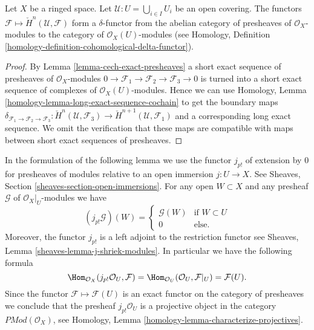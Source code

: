 \begin{lemma}
\label{lemma-cech-cohomology-delta-functor-presheaves}
Let $X$ be a ringed space.
Let $\mathcal{U} : U = \bigcup_{i \in I} U_i$ be an open covering.
The functors $\mathcal{F} \mapsto \check{H}^n(\mathcal{U}, \mathcal{F})$
form a $\delta$-functor from the abelian category of
presheaves of $\mathcal{O}_X$-modules to the category
of $\mathcal{O}_X(U)$-modules (see
Homology, Definition \ref{homology-definition-cohomological-delta-functor}).
\end{lemma}

\begin{proof}
By
Lemma \ref{lemma-cech-exact-presheaves}
a short exact sequence of presheaves of
$\mathcal{O}_X$-modules
$0 \to \mathcal{F}_1 \to \mathcal{F}_2 \to \mathcal{F}_3 \to 0$
is turned into a short exact sequence of complexes of
$\mathcal{O}_X(U)$-modules. Hence we can use
Homology, Lemma \ref{homology-lemma-long-exact-sequence-cochain}
to get the boundary maps
$\delta_{\mathcal{F}_1 \to \mathcal{F}_2 \to \mathcal{F}_3} :
\check{H}^n(\mathcal{U}, \mathcal{F}_3) \to
\check{H}^{n + 1}(\mathcal{U}, \mathcal{F}_1)$
and a corresponding long exact sequence. We omit the verification
that these maps are compatible with maps between short exact
sequences of presheaves.
\end{proof}


\noindent
In the formulation of the following lemma we use the functor $j_{p!}$ of
extension by $0$ for presheaves of modules
relative to an open immersion $j : U \to X$.
See Sheaves, Section \ref{sheaves-section-open-immersions}. For any open
$W \subset X$ and any presheaf $\mathcal{G}$ of $\mathcal{O}_X|_U$-modules
we have
$$
(j_{p!}\mathcal{G})(W) =
\left\{
\begin{matrix}
\mathcal{G}(W) & \text{if } W \subset U \\
0 & \text{else.}
\end{matrix}
\right.
$$
Moreover, the functor $j_{p!}$ is a left adjoint to the restriction functor
see Sheaves, Lemma \ref{sheaves-lemma-j-shriek-modules}.
In particular we have the following formula
$$
\Hom_{\mathcal{O}_X}(j_{p!}\mathcal{O}_U, \mathcal{F})
=
\Hom_{\mathcal{O}_U}(\mathcal{O}_U, \mathcal{F}|_U)
=
\mathcal{F}(U).
$$
Since the functor $\mathcal{F} \mapsto \mathcal{F}(U)$ is an exact functor
on the category of presheaves we conclude that the presheaf
$j_{p!}\mathcal{O}_U$ is a projective object in the category
$\textit{PMod}(\mathcal{O}_X)$, see
Homology, Lemma \ref{homology-lemma-characterize-projectives}.

